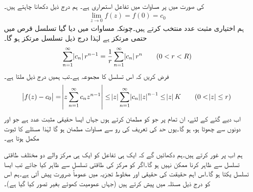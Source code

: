 \quad {}\\
 کی صورت میں  پر  مساوات  میں تفاعل   استمراری ہے۔
\quad
ہم درج ذیل دکھانا چاہتے ہیں۔
\begin{align}\label{مساوات_ٹیلر_طاقتی_تسلسل_اور_تحلیلی_تفاعل_ب}
\lim_{z\to 0} f(z)=f(0)=c_0
\end{align}
ہم اختیاری مثبت عدد  منتخب کرتے ہیں۔چونکہ مساوات  میں دیا گیا تسلسل  قرص  میں حتمی مرتکز ہے لہٰذا درج ذیل تسلسل مرتکز ہو گا۔
\begin{align*}
\sum\limits_{n=1}^{\infty}\abs{c_n}r^{n-1}=\frac{1}{r}\sum\limits_{n=1}^{\infty} \abs{c_n}r^n\quad \quad (0<r<R)
\end{align*}
فرض کریں کہ اس تسلسل کا مجموعہ  ہے۔تب ہمیں درج ذیل ملتا ہے۔
\begin{align*}
\abs{f(z)-c_0}=\abs{z\sum\limits_{n=1}^{\infty} c_n z^{n-1}}\le \abs{z}\sum\limits_{n=1}^{\infty}\abs{c_n}\abs{z}^{n-1}\le \abs{z}K\quad \quad (0<\abs{z}\le r)
\end{align*}
اب دیے گئے   کے لئے، ان تمام  پر جو  کو مطمئن کرتے ہوں جہاں  ایسا حقیقی مثبت عدد ہے جو  اور  دونوں سے چھوٹا ہو،   ہو گا۔یوں حد کی تعریف کی رو سے مساوات  مطمئن ہو گا لہٰذا مسئلے کا ثبوت مکمل ہوتا ہے۔ 

ہم اب  پر غور کرتے ہیں۔ہم دکھائیں گے کہ ایک ہی تفاعل  کو ایک ہی مرکز والے دو مختلف طاقتی تسلسل سے ظاہر کرنا ممکن نہیں ہو گا۔اگر  کو مرکز  کی طاقتی تسلسل سے ظاہر کیا جائے تب ایسا تسلسل یکتا ہو گا۔اس اہم حقیقت کی حقیقی اور مخلوط تجزیہ میں عموماً ضرورت پیش آتی ہے۔ہم اس کو درج ذیل مسئلہ میں پیش کرتے ہیں (جہاں عمومیت کھوئے بغیر  تصور کیا گیا ہے)۔ 

